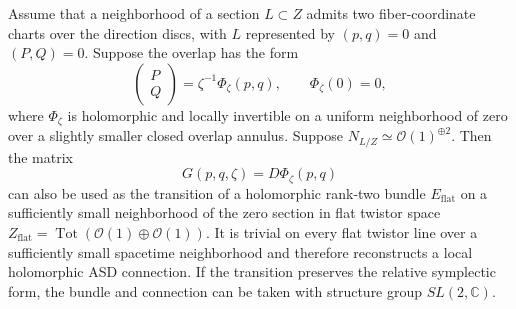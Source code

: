 \begin{proposition}
Assume that a neighborhood of a section $L\subset Z$ admits two
fiber-coordinate charts over the direction discs, with $L$ represented
by $(p,q)=0$ and $(P,Q)=0$. Suppose the overlap has the form
\begin{equation}\label{eq:audit-general-transition}
\begin{pmatrix}P\\Q\end{pmatrix}
=\zeta^{-1}\Phi_\zeta(p,q),
\qquad \Phi_\zeta(0)=0,
\end{equation}
where $\Phi_\zeta$ is holomorphic and locally invertible on a uniform
neighborhood of zero over a slightly smaller closed overlap annulus.
Suppose $N_{L/Z}\simeq\mathcal O(1)^{\oplus2}$. Then the matrix
\[
G(p,q,\zeta)=D\Phi_\zeta(p,q)
\]
can also be used as the transition of a holomorphic rank-two bundle
$E_{\mathrm{flat}}$ on a sufficiently small neighborhood of the zero
section in flat twistor space
$Z_{\mathrm{flat}}=\operatorname{Tot}(\mathcal O(1)\oplus\mathcal O(1))$.
It is trivial on every flat twistor line over a sufficiently small
spacetime neighborhood and therefore reconstructs a local holomorphic
ASD connection. If the transition preserves the relative symplectic
form, the bundle and connection can be taken with structure group
$SL(2,\mathbb C)$.
\end{proposition}
